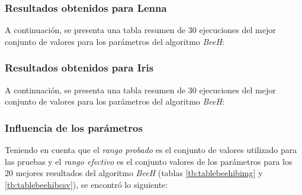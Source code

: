 \subsubsection{Resultados obtenidos para \textbf{Lenna}}

    A continuación, se presenta una tabla resumen de 30 ejecuciones del mejor
conjunto de valores para los parámetros del algoritmo \emph{BeeH}:



\pagebreak

\subsubsection{Resultados obtenidos para \textbf{Iris}}

    A continuación, se presenta una tabla resumen de 30 ejecuciones del mejor
conjunto de valores para los parámetros del algoritmo \emph{BeeH}:



\subsubsection{Influencia de los parámetros}

Teniendo en cuenta que el \emph{rango probado} es el conjunto de valores utilizado
para las pruebas y el \emph{rango efectivo} es el conjunto valores de los parámetros
para los 20 mejores resultados del algoritmo \emph{BeeH} (tablas \ref{tb:tablebeehibimg}
y \ref{tb:tablebeehibcsv}), se encontró lo siguiente:

